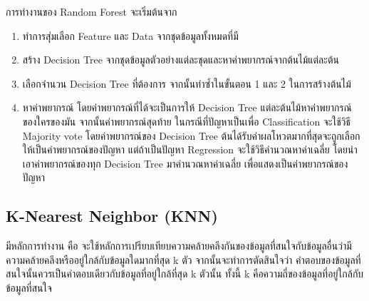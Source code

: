 \documentclass[12pt,oneside,openright,a4paper]{cpe-thai-project}
\begin{document}
    การทำงานของ Random Forest จะเริ่มต้นจาก 
    \begin{enumerate}
      \item ทำการสุ่มเลือก Feature และ Data จากชุดข้อมูลทั้งหมดที่มี 
      \item สร้าง Decision Tree จากชุดข้อมูลตัวอย่างแต่ละชุดและหาค่าพยากรณ์จากต้นไม้แต่ละต้น
      \item เลือกจำนวน Decision Tree ที่ต้องการ จากนั้นทำซ้ำในขั้นตอน 1 และ 2 ในการสร้างต้นไม้ 
      \item หาค่าพยากรณ์ โดยค่าพยากรณ์ที่ได้จะเป็นการให้ Decision Tree แต่ละต้นไม้หาค่าพยากรณ์ของใครของมัน จากนั้นค่าพยากรณ์สุดท้าย 
      ในกรณีที่ปัญหาเป็นเพื่อ Classification จะใช้วิธี Majority vote โดยค่าพยากรณ์ของ Decision Tree ต้นได้รับค่าผลโหวตมากที่สุดจะถูกเลือกให้เป็นค่าพยากรณ์ของปัญหา 
      แต่ถ้าเป็นปัญหา Regression จะใช้วิธีคำนวณหาค่าเฉลี่ย 
      โดยนำเอาค่าพยากรณ์ของทุก Decision Tree มาคำนวณหาค่าเฉลี่ย เพื่อแสดงเป็นค่าพยากรณ์ของปัญหา
    \end{enumerate}
  \subsection{K-Nearest Neighbor (KNN)}
    \hspace{1cm}มีหลักการทำงาน คือ จะใช้หลักการเปรียบเทียบความคล้ายคลึงกันของข้อมูลที่สนใจกับข้อมูลอื่นว่ามีความคล้ายคลึงหรืออยู่ใกล้กับข้อมูลใดมากที่สุด k ตัว 
    จากนั้นจะทำการตัดสินใจว่า คำตอบของข้อมูลที่สนใจนั้นควรเป็นคำตอบเดียวกับข้อมูลที่อยู่ใกล้ที่สุด k ตัวนั้น ทั้งนี้ k คือความถี่ของข้อมูลที่อยู่ใกล้กับข้อมูลที่สนใจ \cite{data_sci} 
\end{document}

